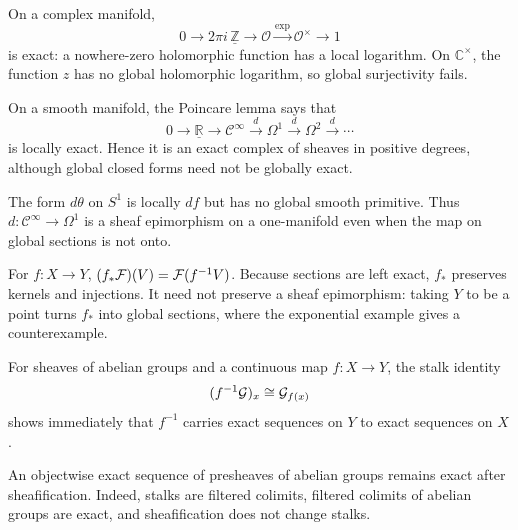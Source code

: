 \begin{example}
On a complex manifold,
\[
0\to 2\pi i\,\underline{\mathbb Z}\to\mathcal O
\xrightarrow{\exp}\mathcal O^\times\to1
\]
is exact: a nowhere-zero holomorphic function has a local logarithm.  On $\mathbb C^\times$, the function $z$ has no global holomorphic logarithm, so global surjectivity fails.
\end{example}

\begin{example}
On a smooth manifold, the Poincare lemma says that
\[
0\to\underline{\mathbb R}\to\mathcal C^\infty\xrightarrow{d}\Omega^1\xrightarrow{d}\Omega^2\xrightarrow{d}\cdots
\]
is locally exact.  Hence it is an exact complex of sheaves in positive degrees, although global closed forms need not be globally exact.
\end{example}

\begin{example}
The form $d\theta$ on $S^1$ is locally $df$ but has no global smooth primitive.  Thus $d:\mathcal C^\infty\to\Omega^1$ is a sheaf epimorphism on a one-manifold even when the map on global sections is not onto.
\end{example}

\begin{example}
For $f:X\to Y$, $(f_*\mathcal F)(V)=\mathcal F(f^{-1}V)$.  Because sections are left exact, $f_*$ preserves kernels and injections.  It need not preserve a sheaf epimorphism: taking $Y$ to be a point turns $f_*$ into global sections, where the exponential example gives a counterexample.
\end{example}

\begin{example}
For sheaves of abelian groups and a continuous map $f:X\to Y$, the stalk identity
\[
(f^{-1}\mathcal G)_x\cong\mathcal G_{f(x)}
\]
shows immediately that $f^{-1}$ carries exact sequences on $Y$ to exact sequences on $X$.
\end{example}

\begin{example}
An objectwise exact sequence of presheaves of abelian groups remains exact after sheafification.  Indeed, stalks are filtered colimits, filtered colimits of abelian groups are exact, and sheafification does not change stalks.
\end{example}


